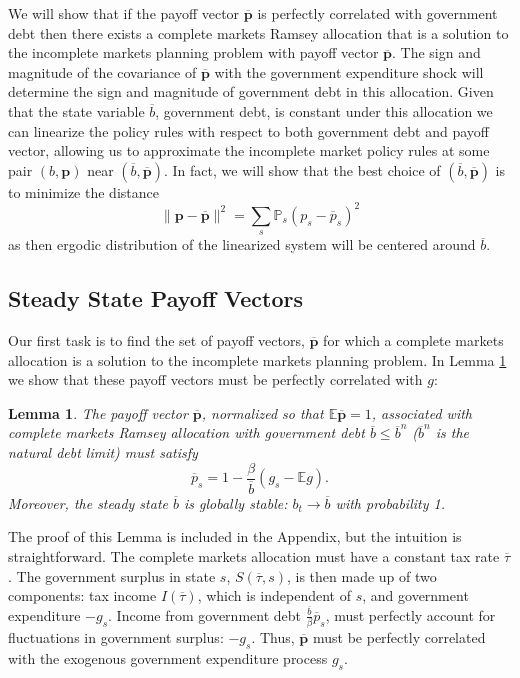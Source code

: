 \documentclass[12pt]{article}
\newcommand{\EE}{\mathbb E}
\newtheorem{lemma}[theorem]{Lemma}
\begin{document}
We will show that if the payoff vector $\overline{\bm p}$ is perfectly correlated with government debt then there exists a complete markets Ramsey allocation that is a solution to the incomplete markets planning problem with payoff vector $\overline{\bm p}$.  The sign and magnitude of the covariance of $\overline {\bm p}$ with the government expenditure shock will determine the sign and magnitude of government debt in this allocation.  Given that the state variable $\overline b$, government debt, is constant under this allocation we can linearize the policy rules with respect to both government debt and payoff vector, allowing us to approximate the incomplete market policy rules at some pair $(b,\bm p)$ near $(\overline b,\overline {\bm p})$.  In fact, we will show that the best choice of $(\overline b,\overline{\bm p})$ is to minimize the distance
\begin{equation}\label{eq.p_norm}
	\| \bm p -\overline{\bm p}\|^2 = \sum_s \mathbb P_s (p_s -\overline p_s)^2
\end{equation} as then ergodic distribution of the linearized system will be centered around $\overline b$.

\subsection{Steady State Payoff Vectors}

Our first task is to find the set of payoff vectors, $\overline {\bm p}$ for which a complete markets allocation is a solution to the incomplete markets planning problem.  In Lemma \ref{lem.cm_payoff} we show that these payoff vectors must be perfectly correlated with $g$:
\begin{lemma}\label{lem.cm_payoff}
	 The payoff vector $\overline{\bm p}$, normalized so that $\EE\overline{\bm p} = 1$, associated with complete markets Ramsey allocation with government debt $\overline b \leq \overline b^n$ ($\overline b^n$ is the natural debt limit) must satisfy
	\begin{equation}\label{eq.pbar}
		\overline p_s = 1- \frac{\beta}{\overline b}(g_s - \EE g).
	\end{equation}Moreover, the steady state $\overline b$ is globally stable: $b_t\rightarrow \overline b$ with probability 1.
\end{lemma}  The proof of this Lemma is included in the Appendix, but the intuition is straightforward.  The complete markets allocation must have a constant tax rate $\overline \tau$.  The government surplus in state $s$, $S(\overline \tau,s)$, is then made up of two components: tax income $I(\overline \tau)$, which is independent of $s$, and government expenditure $-g_s$.  Income from government debt $\frac{\overline b}{\beta} \overline p_s$, must perfectly account for fluctuations in government surplus: $-g_s$.  Thus, $\overline{\bm p}$ must be perfectly correlated with the exogenous government expenditure process $g_s$.
\end{document}
